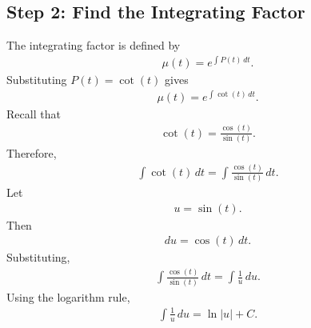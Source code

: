 \documentclass[letterpaper,10pt,english]{sphinxmanual}
\begin{document}
\subsection{Step 2: Find the Integrating Factor}
\label{\detokenize{Language/Science_language/ODE_calculus/course_MATH_3035/homework_assignments/index_pdf:id7}}
\sphinxAtStartPar
The integrating factor is defined by
\begin{equation*}
\begin{split}\mu(t)=e^{\int P(t)\,dt}.\end{split}
\end{equation*}
\sphinxAtStartPar
Substituting \(P(t)=\cot(t)\) gives
\begin{equation*}
\begin{split}\mu(t)=e^{\int \cot(t)\,dt}.\end{split}
\end{equation*}
\sphinxAtStartPar
Recall that
\begin{equation*}
\begin{split}\cot(t)=\frac{\cos(t)}{\sin(t)}.\end{split}
\end{equation*}
\sphinxAtStartPar
Therefore,
\begin{equation*}
\begin{split}\int \cot(t)\,dt
=
\int \frac{\cos(t)}{\sin(t)}\,dt.\end{split}
\end{equation*}
\sphinxAtStartPar
Let
\begin{equation*}
\begin{split}u=\sin(t).\end{split}
\end{equation*}
\sphinxAtStartPar
Then
\begin{equation*}
\begin{split}du=\cos(t)\,dt.\end{split}
\end{equation*}
\sphinxAtStartPar
Substituting,
\begin{equation*}
\begin{split}\int \frac{\cos(t)}{\sin(t)}\,dt
=
\int \frac{1}{u}\,du.\end{split}
\end{equation*}
\sphinxAtStartPar
Using the logarithm rule,
\begin{equation*}
\begin{split}\int \frac{1}{u}\,du
=
\ln|u|+C.\end{split}
\end{equation*}
\end{document}
